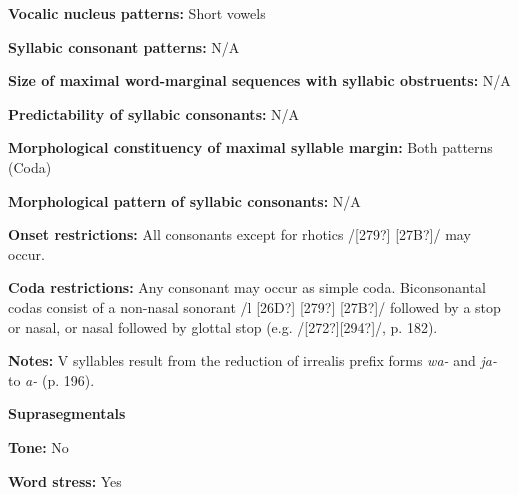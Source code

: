 \begin{styleBody}
\textbf{Vocalic nucleus patterns:} Short vowels
\end{styleBody}

\begin{styleBody}
\textbf{Syllabic consonant patterns:} N/A
\end{styleBody}

\begin{styleBody}
\textbf{Size of maximal word{}-marginal sequences with syllabic obstruents:} N/A
\end{styleBody}

\begin{styleBody}
\textbf{Predictability of syllabic consonants:} N/A
\end{styleBody}

\begin{styleBody}
\textbf{Morphological constituency of maximal syllable margin:} Both patterns (Coda)
\end{styleBody}

\begin{styleBody}
\textbf{Morphological pattern of syllabic consonants:} N/A
\end{styleBody}

\begin{styleBody}
\textbf{Onset restrictions: }All consonants except for rhotics /[279?] [27B?]/ may occur.
\end{styleBody}

\begin{styleBody}
\textbf{Coda restrictions: }Any consonant may occur as simple coda. Biconsonantal codas consist of a non-nasal sonorant /l [26D?] [279?] [27B?]/ followed by a stop or nasal, or nasal followed by glottal stop (e.g. /[272?][294?]/, p. 182).
\end{styleBody}

\begin{styleBody}
\textbf{Notes: }V syllables result from the reduction of irrealis prefix forms \textit{wa-} and \textit{ja-} to \textit{a-} (p. 196).
\end{styleBody}

\begin{styleBody}
\textbf{Suprasegmentals}
\end{styleBody}

\begin{styleBody}
\textbf{Tone:} No
\end{styleBody}

\begin{styleBody}
\textbf{Word stress:} Yes
\end{styleBody}

